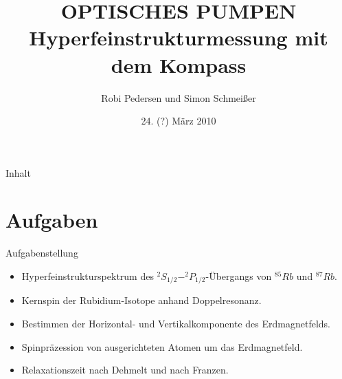 \documentclass{beamer}
\title[Optisches Pumpen]{OPTISCHES PUMPEN \\ Hyperfeinstrukturmessung mit dem Kompass}
\author{Robi Pedersen und Simon Schmeißer}
\institute{Albert-Ludwig-Universität Freiburg}
\date{24. (?) März 2010}
\begin{document}
\begin{frame}
\titlepage
\end{frame}

\begin{frame}[shrink]{Inhalt}
\tableofcontents
\end{frame}


\section{Aufgaben}

\begin{frame}{Aufgabenstellung}
\begin{itemize}
\item Hyperfeinstrukturspektrum des $^2S_{1/2} - ^2P_{1/2}$-Übergangs von $^{85}Rb$ und $^{87}Rb$.
\item Kernspin der Rubidium-Isotope anhand Doppelresonanz.
\item Bestimmen der Horizontal- und Vertikalkomponente des Erdmagnetfelds. 
\item Spinpräzession von ausgerichteten Atomen um das Erdmagnetfeld.
\item Relaxationszeit nach Dehmelt und nach Franzen. 
\end{itemize}
\end{frame}
\end{document}
